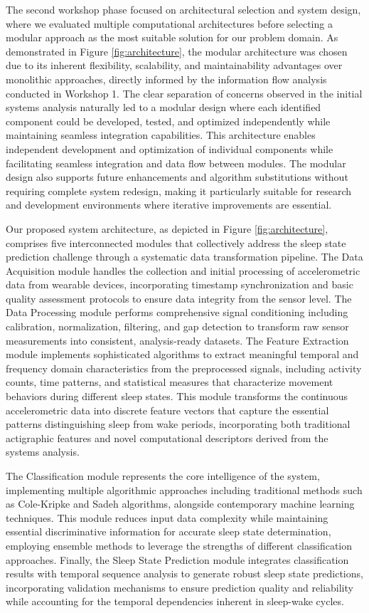 \documentclass[conference]{IEEEtran}
\begin{document}
The second workshop phase focused on architectural selection and system design, where we evaluated multiple computational architectures before selecting a modular approach as the most suitable solution for our problem domain. As demonstrated in Figure \ref{fig:architecture}, the modular architecture was chosen due to its inherent flexibility, scalability, and maintainability advantages over monolithic approaches, directly informed by the information flow analysis conducted in Workshop 1. The clear separation of concerns observed in the initial systems analysis naturally led to a modular design where each identified component could be developed, tested, and optimized independently while maintaining seamless integration capabilities. This architecture enables independent development and optimization of individual components while facilitating seamless integration and data flow between modules. The modular design also supports future enhancements and algorithm substitutions without requiring complete system redesign, making it particularly suitable for research and development environments where iterative improvements are essential.

Our proposed system architecture, as depicted in Figure \ref{fig:architecture}, comprises five interconnected modules that collectively address the sleep state prediction challenge through a systematic data transformation pipeline. The Data Acquisition module handles the collection and initial processing of accelerometric data from wearable devices, incorporating timestamp synchronization and basic quality assessment protocols to ensure data integrity from the sensor level. The Data Processing module performs comprehensive signal conditioning including calibration, normalization, filtering, and gap detection to transform raw sensor measurements into consistent, analysis-ready datasets. The Feature Extraction module implements sophisticated algorithms to extract meaningful temporal and frequency domain characteristics from the preprocessed signals, including activity counts, time patterns, and statistical measures that characterize movement behaviors during different sleep states. This module transforms the continuous accelerometric data into discrete feature vectors that capture the essential patterns distinguishing sleep from wake periods, incorporating both traditional actigraphic features and novel computational descriptors derived from the systems analysis.

The Classification module represents the core intelligence of the system, implementing multiple algorithmic approaches including traditional methods such as Cole-Kripke and Sadeh algorithms, alongside contemporary machine learning techniques. This module reduces input data complexity while maintaining essential discriminative information for accurate sleep state determination, employing ensemble methods to leverage the strengths of different classification approaches. Finally, the Sleep State Prediction module integrates classification results with temporal sequence analysis to generate robust sleep state predictions, incorporating validation mechanisms to ensure prediction quality and reliability while accounting for the temporal dependencies inherent in sleep-wake cycles.
\end{document}
